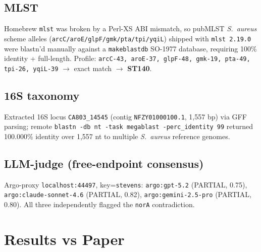 \documentclass[11pt]{article}
\begin{document}
\subsection{MLST}
Homebrew \texttt{mlst} was broken by a Perl-XS ABI mismatch, so pubMLST
\emph{S.\ aureus} scheme alleles (\texttt{arcC/aroE/glpF/gmk/pta/tpi/yqiL})
shipped with \texttt{mlst 2.19.0} were blastn'd manually against a
\texttt{makeblastdb} SO-1977 database, requiring 100\% identity + full-length.
Profile: \texttt{arcC-43, aroE-37, glpF-48, gmk-19, pta-49, tpi-26, yqiL-39}
$\rightarrow$ exact match $\rightarrow$ \textbf{ST140}.

\subsection{16S taxonomy}
Extracted 16S locus \texttt{CA803\_14545} (contig \texttt{NFZY01000100.1},
1{,}557 bp) via GFF parsing; remote \texttt{blastn -db nt -task megablast
-perc\_identity 99} returned 100.000\% identity over 1{,}557 nt to multiple
\emph{S.\ aureus} reference genomes.

\subsection{LLM-judge (free-endpoint consensus)}
Argo-proxy \texttt{localhost:44497}, key=\texttt{stevens}: \texttt{argo:gpt-5.2}
(PARTIAL, 0.75), \texttt{argo:claude-sonnet-4.6} (PARTIAL, 0.82),
\texttt{argo:gemini-2.5-pro} (PARTIAL, 0.80). All three independently
flagged the \texttt{norA} contradiction.

\section{Results vs Paper}
\end{document}
